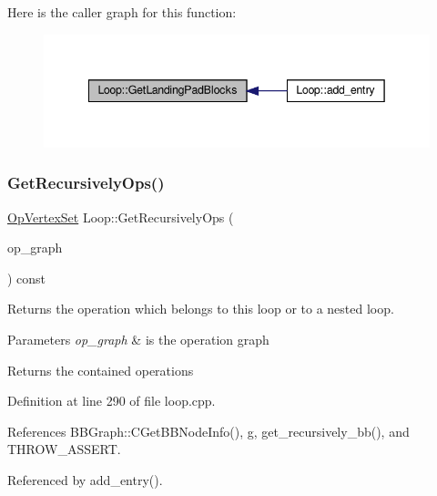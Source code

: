 Here is the caller graph for this function\+:
\nopagebreak
\begin{figure}[H]
\begin{center}
\leavevmode
\includegraphics[width=342pt]{de/d77/classLoop_a36c29ca47492fb97f4c2c64640a5ca4e_icgraph}
\end{center}
\end{figure}
\mbox{\label{classLoop_a03dccc95debe3862b1827f28585300c8}} 
\subsubsection{\texorpdfstring{Get\+Recursively\+Ops()}{GetRecursivelyOps()}}
{\footnotesize\ttfamily \hyperlink{classOpVertexSet}{Op\+Vertex\+Set} Loop\+::\+Get\+Recursively\+Ops (\begin{DoxyParamCaption}\item[{const \hyperlink{op__graph_8hpp_a9a0b240622c47584bee6951a6f5de746}{Op\+Graph\+Const\+Ref}}]{op\+\_\+graph }\end{DoxyParamCaption}) const}



Returns the operation which belongs to this loop or to a nested loop. 


\begin{DoxyParams}{Parameters}
{\em op\+\_\+graph} & is the operation graph \\
\hline
\end{DoxyParams}
\begin{DoxyReturn}{Returns}
the contained operations 
\end{DoxyReturn}


Definition at line 290 of file loop.\+cpp.



References B\+B\+Graph\+::\+C\+Get\+B\+B\+Node\+Info(), g, get\+\_\+recursively\+\_\+bb(), and T\+H\+R\+O\+W\+\_\+\+A\+S\+S\+E\+RT.



Referenced by add\+\_\+entry().

